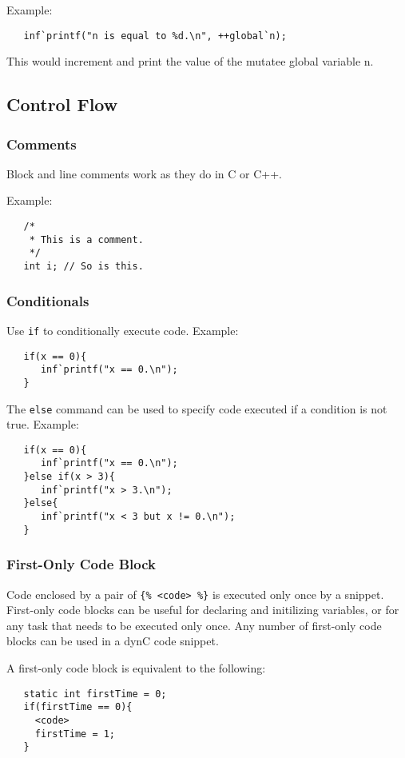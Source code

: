 \documentclass{article}
\begin{document}
\noindent Example:
\begin{lstlisting}
   inf`printf("n is equal to %d.\n", ++global`n);
\end{lstlisting}
This would increment and print the value of the mutatee global variable n.

\subsection{Control Flow}

\subsubsection{Comments}
Block and line comments work as they do in C or C++.

\noindent Example:
\begin{lstlisting}
   /*
    * This is a comment.
    */
   int i; // So is this.
\end{lstlisting}

\subsubsection{Conditionals}
Use \verb!if! to conditionally execute code. 
\noindent Example:
\begin{lstlisting}
   if(x == 0){
      inf`printf("x == 0.\n");
   }
\end{lstlisting}
The \verb!else! command can be used to specify code executed if a condition is not true.
\noindent Example:
\begin{lstlisting}
   if(x == 0){
      inf`printf("x == 0.\n");
   }else if(x > 3){
      inf`printf("x > 3.\n");
   }else{
      inf`printf("x < 3 but x != 0.\n");
   }
\end{lstlisting}

\subsubsection{First-Only Code Block}
\label{sec:firstOnly}
Code enclosed by a pair of \verb!{% <code> %}! is executed only once by a snippet. First-only code blocks can be useful for declaring and initilizing variables, or for any task that needs to be executed only once. Any number of first-only code blocks can be used in a dynC code snippet.

\noindent A first-only code block is equivalent to the following:
\begin{lstlisting}
   static int firstTime = 0;
   if(firstTime == 0){
     <code>
     firstTime = 1;
   }
\end{lstlisting}
\end{document}
